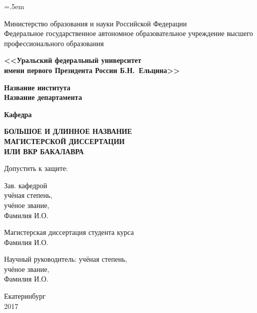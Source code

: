 \newpage
\thispagestyle{empty}

\begin{centering}

\linespread{1.0}\parskip=.5em

{\scriptsize
Министерство образования и науки Российской Федерации\\
Федеральное государственное автономное образовательное учреждение высшего профессионального образования

\smallskip\small

\textbf{<<Уральский федеральный университет}\\
\textbf{имени первого Президента России Б.Н.~Ельцина>>}

\smallskip\normalsize

\textbf{Название института}\\
\textbf{Название департамента}

\smallskip\textbf{Кафедра}}

\vfill

{
  \large
  \textbf{БОЛЬШОЕ И ДЛИННОЕ НАЗВАНИЕ}\\
  \textbf{МАГИСТЕРСКОЙ ДИССЕРТАЦИИ}\\
  \textbf{ИЛИ ВКР БАКАЛАВРА}\\
}

\vfill

\begin{minipage}[t]{.65\textwidth}
Допустить к защите:\bigskip

Зав. кафедрой\\
учёная степень,\\
учёное звание,\\
Фамилия И.О.
\end{minipage}%
%
\begin{minipage}[t]{.35\textwidth}
Магистерская диссертация студента курса\\
Фамилия И.О.\bigskip

Научный руководитель:
учёная степень,\\
учёное звание,\\
Фамилия И.О.
\end{minipage}

\vfill

{Екатеринбург\\2017}

\end{centering}
